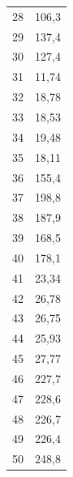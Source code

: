 \begin{figure}[h]
\begin{minipage}[l]{0.32\textwidth}
\begin{tabular}{|c|c|}
            28 & 106,3\\
            29 & 137,4\\
            30 & 127,4\\
            31 & 11,74\\
            32 & 18,78\\
            33 & 18,53\\
            34 & 19,48\\
            35 & 18,11\\
            36 & 155,4\\
            37 & 198,8\\
            38 & 187,9\\
            39 & 168,5\\
            40 & 178,1\\
            41 & 23,34\\
            42 & 26,78\\
            43 & 26,75\\
            44 & 25,93\\
            45 & 27,77\\
            46 & 227,7\\
            47 & 228,6\\
            48 & 226,7\\
            49 & 226,4\\
            50 & 248,8\\



\end{tabular}
\end{minipage}
\end{figure}
